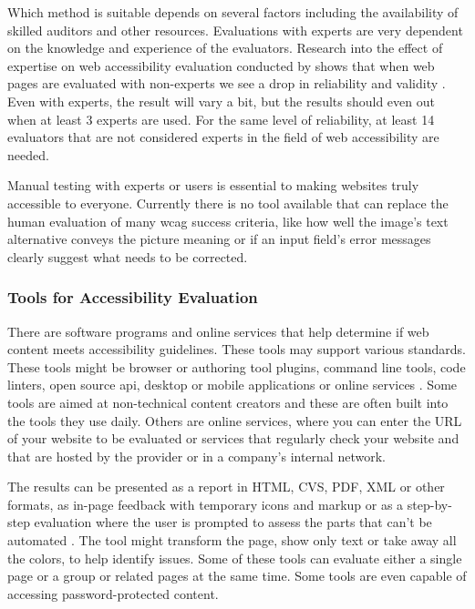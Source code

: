 \documentclass{master_thesis}
\begin{document}
Which method is suitable depends on several factors including the availability of skilled auditors and other resources. Evaluations with experts are very dependent on the knowledge and experience of the evaluators. Research into the effect of expertise on web accessibility evaluation conducted by \citeauthor{Brajnik2011} shows that when web pages are evaluated with non-experts we see a drop in reliability and validity \citep{Brajnik2011}. Even with experts, the result will vary a bit, but the results should even out when at least 3 experts are used. For the same level of reliability, at least 14 evaluators that are not considered experts in the field of web accessibility are needed.

Manual testing with experts or users is essential to making websites truly accessible to everyone. Currently there is no tool available that can replace the human evaluation of many \ac{wcag} success criteria, like how well the image's text alternative conveys the picture meaning or if an input field's error messages clearly suggest what needs to be corrected.


\subsubsection{Tools for Accessibility Evaluation}

There are software programs and online services that help determine if web content meets accessibility guidelines. These tools may support various standards. These tools might be browser or authoring tool plugins, command line tools, code linters, open source \ac{api}, desktop or mobile applications or online services \citep{AbouZahra2017}. Some tools are aimed at non-technical content creators and these are often built into the tools they use daily. Others are online services, where you can enter the URL of your website to be evaluated or services that regularly check your website and that are hosted by the provider or in a company's internal network.

The results can be presented as a report in HTML, CVS, PDF, XML or other formats, as in-page feedback with temporary icons and markup or as a step-by-step evaluation where the user is prompted to assess the parts that can't be automated \citep{AbouZahra2017}. The tool might transform the page, show only text or take away all the colors, to help identify issues. Some of these tools can evaluate either a single page or a group or related pages at the same time. Some tools are even capable of accessing password-protected content.
\end{document}
